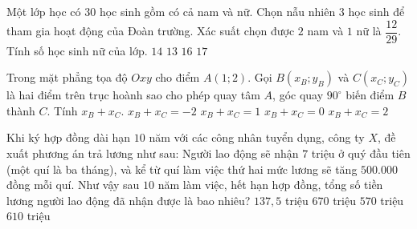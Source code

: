 \begin{ex}%
Một lớp học có $30$ học sinh gồm có cả nam và nữ. Chọn nẫu nhiên $3$ học sinh để tham gia hoạt động của Đoàn trường. Xác suất chọn được $2$ nam và $1$ nữ là $\dfrac{12}{29}$. Tính số học sinh nữ của lớp.
\choice
{\True $14$}
{$13$}
{$16$}
{$17$}
\end{ex}

\begin{ex}%
Trong mặt phẳng tọa độ $Oxy$ cho điểm $A\left(1;2\right)$. Gọi $B\left(x_B;y_B\right)$ và $C\left(x_C;y_C\right)$ là hai điểm trên trục hoành sao cho phép quay tâm $A$, góc quay $90^\circ $ biến điểm $B$ thành $C$. Tính $x_B+x_C$.
\choice
{$x_B+x_C=-2$}
{$x_B+x_C=1$}
{$x_B+x_C=0$}
{\True $x_B+x_C=2$}
\end{ex}

\begin{ex}%
Khi ký hợp đồng dài hạn $10$ năm với các công nhân tuyển dụng, công ty $X$, đề xuất phương án trả lương như sau: Người lao động sẽ nhận $7$ triệu ở quý đầu tiên (một quí là ba tháng), và kể từ quí làm việc thứ hai mức lương sẽ tăng $500.000$ đồng mỗi quí. Như vậy sau $10$ năm làm việc, hết hạn hợp đồng, tổng số tiền lương người lao động đã nhận được là bao nhiêu?
\choice
{$137,5$ triệu}
{\True $670$ triệu}
{$570$ triệu}
{$610$ triệu}
\end{ex}

